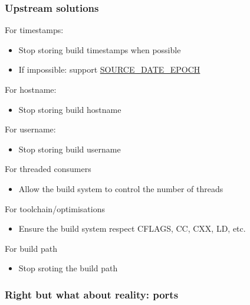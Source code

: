 \begin{frame}
	\frametitle{Upstream solutions}
	For timestamps:
	\begin{itemize}
		\item Stop storing build timestamps when possible
	\item If impossible: support \href{https://reproducible-builds.org/specs/source-date-epoch/}{SOURCE\_DATE\_EPOCH}
	\end{itemize}
	\pause
	For hostname:
	\begin{itemize}
		\item Stop storing build hostname
	\end{itemize}
	\pause
	For username:
	\begin{itemize}
		\item Stop storing build username
	\end{itemize}
	\pause
	For threaded consumers
	\begin{itemize}
		\item Allow the build system to control the number of threads
	\end{itemize}
	\pause
	For toolchain/optimisations
	\begin{itemize}
		\item Ensure the build system respect CFLAGS, CC, CXX, LD, etc.
	\end{itemize}
	\pause
	For build path
	\begin{itemize}
		\item Stop sroting the build path
	\end{itemize}
\end{frame}

\begin{frame}
	\frametitle{Right but what about reality: ports}
	\pause
\end{frame}

